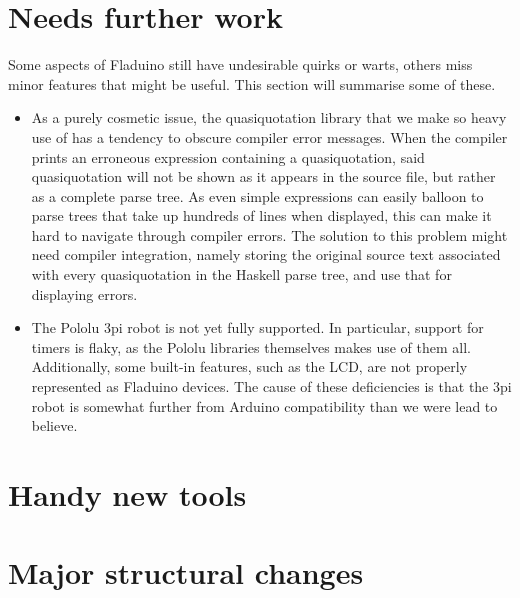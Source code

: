 \documentclass[a4paper, oneside, final]{memoir}
\begin{document}
\section{Needs further work}

Some aspects of Fladuino still have undesirable quirks or warts,
others miss minor features that might be useful.  This section will
summarise some of these.

\begin{itemize}
\item As a purely cosmetic issue, the quasiquotation library that we
  make so heavy use of has a tendency to obscure compiler error
  messages.  When the compiler prints an erroneous expression
  containing a quasiquotation, said quasiquotation will not be shown
  as it appears in the source file, but rather as a complete parse
  tree.  As even simple expressions can easily balloon to parse trees
  that take up hundreds of lines when displayed, this can make it hard
  to navigate through compiler errors.  The solution to this problem
  might need compiler integration, namely storing the original source
  text associated with every quasiquotation in the Haskell parse tree,
  and use that for displaying errors.
\item The Pololu 3pi robot is not yet fully supported.  In particular,
  support for timers is flaky, as the Pololu libraries themselves
  makes use of them all.  Additionally, some built-in features, such
  as the LCD, are not properly represented as Fladuino devices.  The
  cause of these deficiencies is that the 3pi robot is somewhat
  further from Arduino compatibility than we were lead to believe.
\end{itemize}

\section{Handy new tools}

\section{Major structural changes}
\end{document}
